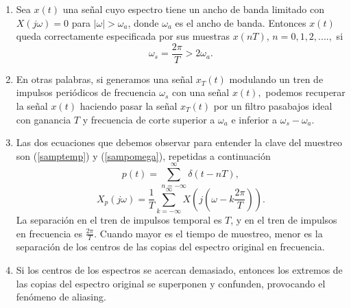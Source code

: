 \begin{enumerate}
        \item   Sea $x\left( t\right) $ una se\~{n}al cuyo espectro tiene un ancho de banda limitado con 
          $X\left( j\omega \right) =0$ para $\left| \omega \right| >\omega_{a}$, donde $\omega_{a}$ 
          es el ancho de banda. Entonces $x\left( t\right) $ queda correctamente especificada por 
          sus muestras $x\left( nT\right)$, $n=0, 1, 2,....,$ si
        \begin{equation}
                \omega_{s}=\frac{2\pi }{T}>2\omega_{a}.
        \end{equation}
        
        \item En otras palabras, si generamos una se\~{n}al $x_{T}^{ }\left( t\right) $ modulando un tren 
          de impulsos peri\'{o}dicos de frecuencia $\omega_{s}$ con una se\~{n}al $x\left( t\right),$ 
          podemos recuperar la se\~{n}al $x(t)$ haciendo pasar la se\~{n}al $x_{T}\left( t\right)$ por un 
          filtro pasabajos ideal con ganancia $T$ y frecuencia de corte superior a $\omega_{a}$ e inferior 
          a $\omega_{s}-\omega_{a}$.

        \item Las dos ecuaciones que debemos observar para entender la clave del muestreo son 
          (\ref{samptemp}) y (\ref{sampomega}), repetidas a continuaci\'{o}n
        \begin{equation}
                p\left( t\right) =\sum_{n=-\infty }^{\infty }\delta \left( t-nT\right),
        \end{equation}
        \begin{equation}
                X_{p}\left( j\omega \right) =
                \frac{1}{T}
                \sum_{k=-\infty }^{\infty } X\left(j\left( \omega -k\frac{2\pi }{T}\right) \right).
        \end{equation}
        La separaci\'{o}n en el tren de impulsos temporal es $T$, y en el tren de impulsos en frecuencia 
        es $\frac{2\pi }{T}$. Cuando mayor es el tiempo de muestreo, menor es la separaci\'{o}n de los
        centros de las copias del espectro original en frecuencia.

        \item Si los centros de los espectros se acercan demasiado, entonces los extremos de las copias
          del espectro original se superponen y confunden, provocando el fen\'{o}meno de aliasing.

\end{enumerate}
        
